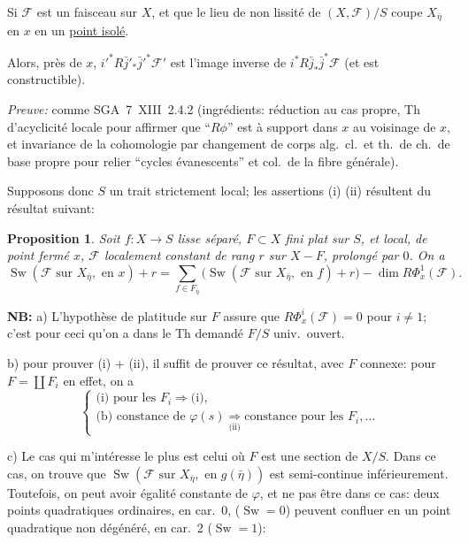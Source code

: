 \documentclass[11pt,a4paper]{article}
\theoremstyle{plain}
\newtheorem{proposition}[theorem]{Proposition}
\theoremstyle{definition}
\DeclareMathOperator{\Sw}{Sw}
\begin{document}
Si $\mathcal{F}$ est un faisceau sur $X$, et que le lieu de non lissit\'e de $(X, \mathcal{F})/S$ coupe $X_{\bar{\eta}}$ en $x$ en un \underline{point isol\'e}.

Alors, pr\`es de $x$, $i'^* R\bar{j}'_* \bar{j}'^* \mathcal{F}'$ est l'image inverse de $i^* R\bar{j}_* \bar{j}^* \mathcal{F}$ (et est constructible).

\medskip

\noindent \textit{Preuve:} comme SGA~7~XIII~2.4.2 (ingr\'edients: r\'eduction au cas propre, Th d'acyclicit\'e locale pour affirmer que ``$R\phi$'' est \`a support dans $x$ au voisinage de $x$, et invariance de la cohomologie par changement de corps alg.\ cl.\ et th.\ de ch.\ de base propre pour relier ``cycles \'evanescents'' et col.\ de la fibre g\'en\'erale).

\medskip

Supposons donc $S$ un trait strictement local; les assertions (i) (ii) r\'esultent du r\'esultat suivant:

\begin{proposition}
Soit $f: X \to S$ lisse s\'epar\'e, $F \subset X$ fini plat sur $S$, et local, de point ferm\'e $x$, $\mathcal{F}$ localement constant de rang $r$ sur $X - F$, prolong\'e par $0$. On a
\[
\Sw(\mathcal{F} \text{ sur } X_{\bar{\eta}}, \text{ en } x) + r = \sum_{f \in F_{\bar{\eta}}} \bigl(\Sw(\mathcal{F} \text{ sur } X_{\bar{\eta}}, \text{ en } f) + r\bigr) - \dim R\Phi_x^1(\mathcal{F}).
\]
\end{proposition}

\medskip

\noindent \textbf{NB:} a) L'hypoth\`ese de platitude sur $F$ assure que $R\Phi_x^i(\mathcal{F}) = 0$ pour $i \neq 1$; c'est pour ceci qu'on a dans le Th demand\'e $F/S$ univ.\ ouvert.

b) pour prouver (i) + (ii), il suffit de prouver ce r\'esultat, avec $F$ connexe: pour $F = \coprod F_i$ en effet, on a
\[
\begin{cases}
\text{(i) pour les } F_i \Rightarrow \text{(i)}, \\
\text{(b) constance de } \varphi(s) \underset{\text{(ii)}}{\Rightarrow} \text{constance pour les } F_i, \ldots
\end{cases}
\]

c) Le cas qui m'int\'eresse le plus est celui o\`u $F$ est une section de $X/S$. Dans ce cas, on trouve que $\Sw(\mathcal{F} \text{ sur } X_{\bar{\eta}}, \text{ en } g(\bar{\eta}))$ est semi-continue inf\'erieurement. Toutefois, on peut avoir \'egalit\'e constante de $\varphi$, et ne pas \^etre dans ce cas: deux points quadratiques ordinaires, en car.\ $0$, ($\Sw = 0$) peuvent confluer en un point quadratique non d\'eg\'en\'er\'e, en car.\ $2$ ($\Sw = 1$):
\end{document}
